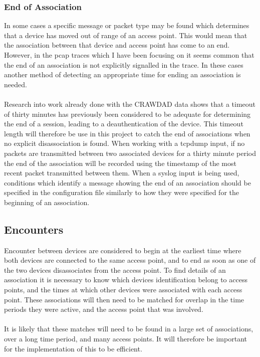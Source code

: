 \subsubsection{End of Association} 
In some cases a specific message or packet type may be found which determines that a device has moved out of range of an access point. This would mean that the association between that device and access point has come to an end. However, in the pcap traces which I have been focusing on it seems common that the end of an association is not explicitly signalled in the trace. In these cases another method of detecting an appropriate time for ending an association is needed. \\\\
Research into work already done with the CRAWDAD data \cite{kotz2002} \cite{henderson2004} shows that a timeout of thirty minutes has previously been considered to be adequate for determining the end of a session, leading to a deauthentication of the device. This timeout length will therefore be use in this project to catch the end of associations when no explicit disassociation is found. 
When working with a tcpdump input, if no packets are transmitted between two associated devices for a thirty minute period the end of the association will be recorded using the timestamp of the most recent packet transmitted between them. When a syslog input is being used, conditions which identify a message showing the end of an association should be specified in the configuration file similarly to how they were specified for the beginning of an association.

\subsection{Encounters} 
Encounter between devices are considered to begin at the earliest time where both devices are connected to the same access point, and to end as soon as one of the two devices disassociates from the access point. To find details of an association it is necessary to know which devices identification belong to access points, and the times at which other devices were associated with each access point. These associations will then need to be matched for overlap in the time periods they were active, and the access point that was involved. \\\\
It is likely that these matches will need to be found in a large set of associations, over a long time period, and many access points. It will therefore be important for the implementation of this to be efficient.


